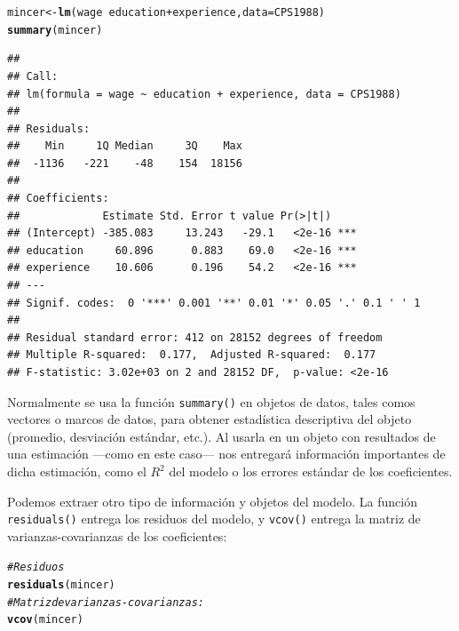 \documentclass{article}\usepackage[]{graphicx}\usepackage[]{color}
\makeatletter
\newcommand{\hlcom}[1]{\textcolor[rgb]{0.678,0.584,0.686}{\textit{#1}}}%
\newcommand{\hlopt}[1]{\textcolor[rgb]{0,0,0}{#1}}%
\newcommand{\hlstd}[1]{\textcolor[rgb]{0.345,0.345,0.345}{#1}}%
\newcommand{\hlkwb}[1]{\textcolor[rgb]{0.69,0.353,0.396}{#1}}%
\newcommand{\hlkwc}[1]{\textcolor[rgb]{0.333,0.667,0.333}{#1}}%
\newcommand{\hlkwd}[1]{\textcolor[rgb]{0.737,0.353,0.396}{\textbf{#1}}}%
\newenvironment{kframe}{%
 \def\at@end@of@kframe{}%
 \ifinner\ifhmode%
  \def\at@end@of@kframe{\end{minipage}}%
  \begin{minipage}{\columnwidth}%
 \fi\fi%
 \def\FrameCommand##1{\hskip\@totalleftmargin \hskip-\fboxsep
 \colorbox{shadecolor}{##1}\hskip-\fboxsep
     \hskip-\linewidth \hskip-\@totalleftmargin \hskip\columnwidth}%
 \MakeFramed {\advance\hsize-\width
   \@totalleftmargin\z@ \linewidth\hsize
   \@setminipage}}%
 {\par\unskip\endMakeFramed%
 \at@end@of@kframe}
\newenvironment{knitrout}{}{} %
\makeatother
\begin{document}
\begin{knitrout}
\color{fgcolor}\begin{kframe}
\begin{alltt}
\hlstd{mincer} \hlkwb{<-} \hlkwd{lm}\hlstd{(wage} \hlopt{~} \hlstd{education} \hlopt{+} \hlstd{experience,} \hlkwc{data} \hlstd{= CPS1988)}
\hlkwd{summary}\hlstd{(mincer)}
\end{alltt}
\begin{verbatim}
## 
## Call:
## lm(formula = wage ~ education + experience, data = CPS1988)
## 
## Residuals:
##    Min     1Q Median     3Q    Max 
##  -1136   -221    -48    154  18156 
## 
## Coefficients:
##             Estimate Std. Error t value Pr(>|t|)    
## (Intercept) -385.083     13.243   -29.1   <2e-16 ***
## education     60.896      0.883    69.0   <2e-16 ***
## experience    10.606      0.196    54.2   <2e-16 ***
## ---
## Signif. codes:  0 '***' 0.001 '**' 0.01 '*' 0.05 '.' 0.1 ' ' 1
## 
## Residual standard error: 412 on 28152 degrees of freedom
## Multiple R-squared:  0.177,	Adjusted R-squared:  0.177 
## F-statistic: 3.02e+03 on 2 and 28152 DF,  p-value: <2e-16
\end{verbatim}
\end{kframe}
\end{knitrout}

Normalmente se usa la función \verb|summary()| en objetos de datos, tales comos vectores o marcos de datos, para obtener estadística descriptiva del objeto (promedio, desviación estándar, etc.). Al usarla en un objeto con resultados de una estimación ---como en este caso--- nos entregará información importantes de dicha estimación, como el $R^2$ del modelo o los errores estándar de los coeficientes.

Podemos extraer otro tipo de información y objetos del modelo. La función \verb|residuals()| entrega los residuos del modelo, y \verb|vcov()| entrega la matriz de varianzas-covarianzas de los coeficientes:

\begin{knitrout}
\color{fgcolor}\begin{kframe}
\begin{alltt}
\hlcom{# Residuos}
\hlkwd{residuals}\hlstd{(mincer)}
\hlcom{# Matriz de varianzas-covarianzas:}
\hlkwd{vcov}\hlstd{(mincer)}
\end{alltt}
\end{kframe}
\end{knitrout}
\end{document}
